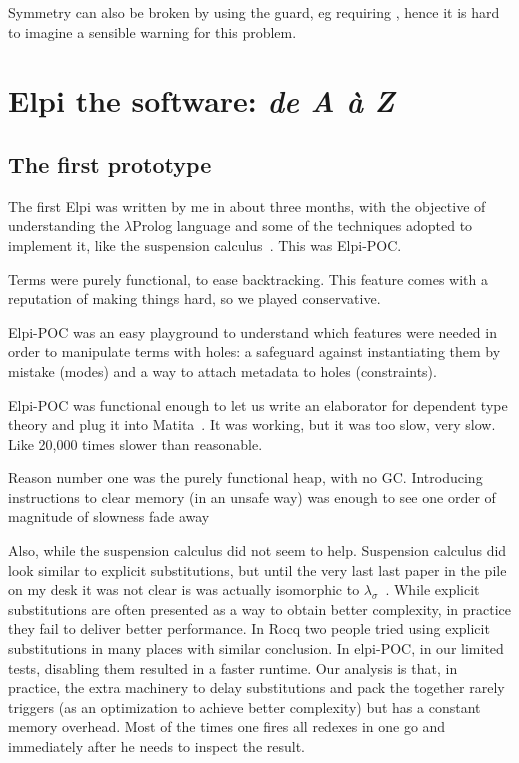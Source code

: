 \documentclass[a4paper, 11pt]{book}
\begin{document}
Symmetry can also be broken by using the guard, eg
requiring , hence it is hard to imagine a
sensible warning for this problem.



\chapter{Elpi the software: \emph{de A \`a Z}}

\section{The first prototype}\label{sec:poc}

The first Elpi was written by me in about three months, with the objective
of understanding the $\lambda$Prolog language and some of the techniques
adopted to implement it, like the suspension calculus~\cite{NADATHUR200235}.
This was Elpi-POC.

Terms were purely functional, to ease backtracking. This feature comes
with a reputation of making things hard, so we played conservative.

Elpi-POC was an easy playground to understand which features were needed in
order to manipulate terms with holes: a safeguard against instantiating them by
mistake (modes) and a way to attach metadata to holes (constraints).

Elpi-POC was functional enough to let us write an elaborator for dependent type
theory and plug it into Matita~\cite{DBLP:conf/cade/AspertiRCT11}. It was working,
but it was too slow, very slow. Like 20,000 times slower than reasonable.

Reason number one was the purely functional heap, with no GC. Introducing 
instructions to clear memory (in an unsafe way) was enough to see one order of
magnitude of slowness fade away

Also, while the suspension calculus did not seem to help.
Suspension calculus did look similar to explicit substitutions, but until the very
last last paper in the pile on my desk it was not clear is was actually isomorphic
to $\lambda_\sigma$~\cite{expsubst}. While explicit substitutions are often presented as a way to
obtain better complexity, in practice they fail to deliver better performance.
In Rocq two people tried using explicit substitutions in many places
with similar conclusion. In elpi-POC, in our limited tests, disabling them resulted in
a faster runtime.  Our analysis is that, in practice, the extra machinery to
delay substitutions and pack the together rarely triggers (as an optimization to achieve better complexity)
but has a constant memory overhead. Most of the times one fires all redexes in
one go and immediately after he needs to inspect the result.
\end{document}
